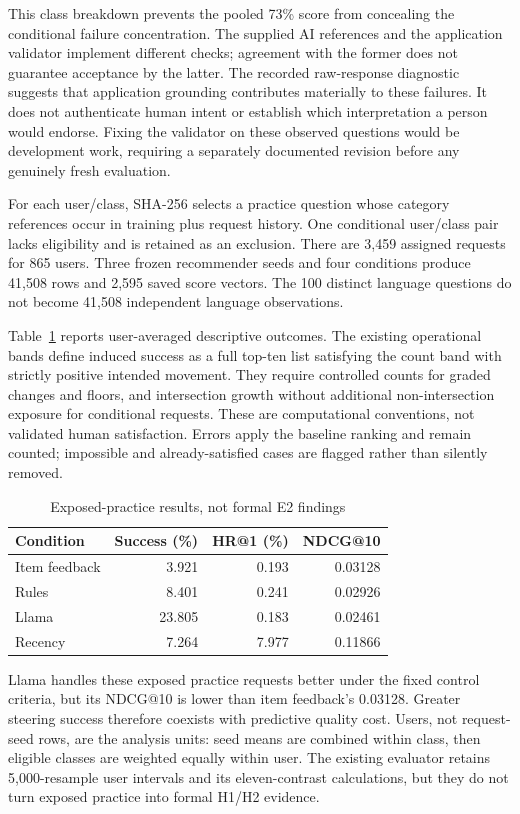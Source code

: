 \documentclass[conference]{IEEEtran}
\begin{document}
This class breakdown prevents the pooled 73\% score from concealing the conditional failure concentration. The supplied AI references and the application validator implement different checks; agreement with the former does not guarantee acceptance by the latter. The recorded raw-response diagnostic suggests that application grounding contributes materially to these failures. It does not authenticate human intent or establish which interpretation a person would endorse. Fixing the validator on these observed questions would be development work, requiring a separately documented revision before any genuinely fresh evaluation.

For each user/class, SHA-256 selects a practice question whose category references occur in training plus request history. One conditional user/class pair lacks eligibility and is retained as an exclusion. There are 3,459 assigned requests for 865 users. Three frozen recommender seeds and four conditions produce 41,508 rows and 2,595 saved score vectors. The 100 distinct language questions do not become 41,508 independent language observations.

Table~\ref{tab:practice} reports user-averaged descriptive outcomes. The existing operational bands define induced success as a full top-ten list satisfying the count band with strictly positive intended movement. They require controlled counts for graded changes and floors, and intersection growth without additional non-intersection exposure for conditional requests. These are computational conventions, not validated human satisfaction. Errors apply the baseline ranking and remain counted; impossible and already-satisfied cases are flagged rather than silently removed.

\begin{table}[t]\centering\small
\caption{Exposed-practice results, not formal E2 findings}\label{tab:practice}
\begin{tabular}{lrrr}\toprule
Condition&Success (\%)&HR@1 (\%)&NDCG@10\\\midrule
Item feedback&3.921&0.193&0.03128\\
Rules&8.401&0.241&0.02926\\
Llama&23.805&0.183&0.02461\\
Recency&7.264&7.977&0.11866\\\bottomrule
\end{tabular}\end{table}

Llama handles these exposed practice requests better under the fixed control criteria, but its NDCG@10 is lower than item feedback's 0.03128. Greater steering success therefore coexists with predictive quality cost. Users, not request-seed rows, are the analysis units: seed means are combined within class, then eligible classes are weighted equally within user. The existing evaluator retains 5,000-resample user intervals and its eleven-contrast calculations, but they do not turn exposed practice into formal H1/H2 evidence.
\end{document}
